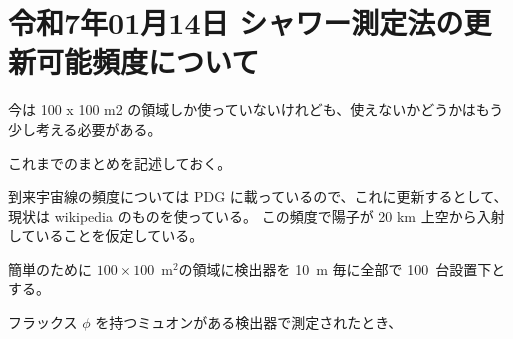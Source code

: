 
\section{令和7年01月14日 シャワー測定法の更新可能頻度について}


今は 100 x 100 m2 の領域しか使っていないけれども、使えないかどうかはもう少し考える必要がある。

これまでのまとめを記述しておく。

到来宇宙線の頻度については PDG に載っているので、これに更新するとして、現状は wikipedia のものを使っている。
この頻度で陽子が 20 km 上空から入射していることを仮定している。

簡単のために $100 \times 100$~m$^2$の領域に検出器を 10~m 毎に全部で 100~台設置下とする。

フラックス $\phi$ を持つミュオンがある検出器で測定されたとき、